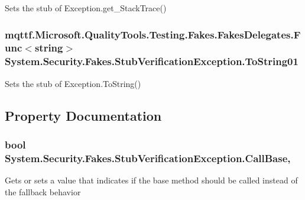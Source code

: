 Sets the stub of Exception.\-get\-\_\-\-Stack\-Trace()

\hypertarget{class_system_1_1_security_1_1_fakes_1_1_stub_verification_exception_a94188e9b60150d3ca54e255203d607bb}{
\subsubsection[{To\-String01}]{\setlength{\rightskip}{0pt plus 5cm}mqttf.\-Microsoft.\-Quality\-Tools.\-Testing.\-Fakes.\-Fakes\-Delegates.\-Func$<$string$>$ System.\-Security.\-Fakes.\-Stub\-Verification\-Exception.\-To\-String01}}\label{class_system_1_1_security_1_1_fakes_1_1_stub_verification_exception_a94188e9b60150d3ca54e255203d607bb}


Sets the stub of Exception.\-To\-String()



\subsection{Property Documentation}
\hypertarget{class_system_1_1_security_1_1_fakes_1_1_stub_verification_exception_a5798b522aa842ad578e6a760ab6ad01a}{
\subsubsection[{Call\-Base}]{\setlength{\rightskip}{0pt plus 5cm}bool System.\-Security.\-Fakes.\-Stub\-Verification\-Exception.\-Call\-Base\hspace{0.3cm}{\ttfamily [get]}, {\ttfamily [set]}}}\label{class_system_1_1_security_1_1_fakes_1_1_stub_verification_exception_a5798b522aa842ad578e6a760ab6ad01a}


Gets or sets a value that indicates if the base method should be called instead of the fallback behavior

